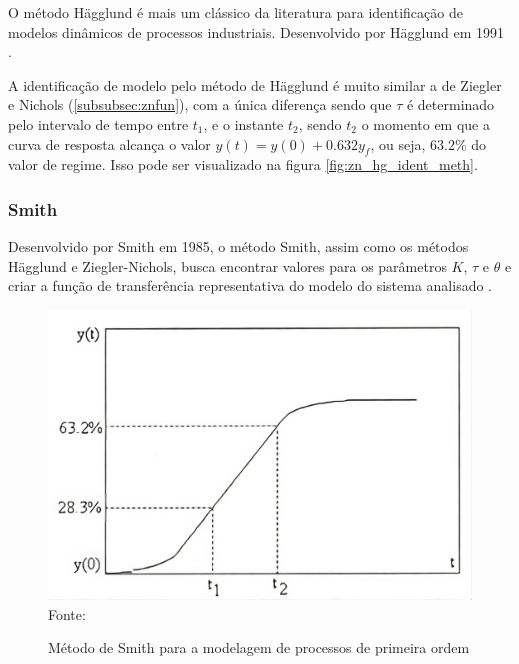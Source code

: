 O método Hägglund é mais um clássico da literatura para identificação de modelos dinâmicos de
processos industriais.
Desenvolvido por Hägglund em 1991 \cite{CoelhoIdentificacao}.

A identificação de modelo pelo método de Hägglund é muito similar a de Ziegler e Nichols (\ref{subsubsec:znfun}), com a única diferença sendo que $\tau$ é determinado pelo intervalo de tempo entre $t_1$, e o instante $t_2$, sendo $t_2$
o momento em que a curva de resposta alcança o valor $y(t) = y(0) + 0.632y_f$, ou seja, $63.2\%$ do valor de regime.
Isso pode ser visualizado na figura \ref{fig:zn_hg_ident_meth}.

\subsubsection{Smith}\label{subsubsec:smfun}

Desenvolvido por Smith em 1985, o método Smith, assim como os métodos Hägglund e Ziegler-Nichols, busca encontrar
valores para os parâmetros $K$, $\tau$ e $\theta$ e criar a função de transferência representativa do modelo do sistema
analisado \cite{CoelhoIdentificacao}.

\begin{figure}[H]
    \centering
    \caption{Método de Smith para a modelagem de processos de primeira ordem}
    \includegraphics[scale=0.3]{figuras/sm_ident_meth}
    \label{fig:sm_ident_meth}
    \\
    \vspace{0cm}\hspace{0cm}\small{Fonte: \cite{CoelhoIdentificacao}}
\end{figure}

